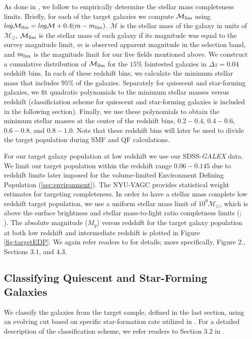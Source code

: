 \documentclass{emulateapj}
\begin{document}
As done in \cite{Moustakas:2013aa}, we follow \cite{Pozzetti:2010aa} to empirically determine the stellar mass completeness limits.
Briefly, for each of the target galaxies we compute $\mathcal{M}_{\rm{lim}}$ using $log \mathcal{M}_{\rm{lim}} = log \mathcal{M} + 0.4 ( m - m_{\rm{lim}})$.
$\mathcal{M}$ is the stellar mass of the galaxy in units of $\mathcal{M_{\odot}}$, $\mathcal{M}_{\rm{lim}}$ is the stellar mass of each galaxy if its magnitude was 
equal to the survey magnitude limit, $m$ is observed apparent magnitude in the selection band, and $m_{\rm{lim}}$ is the magnitude limit for our five fields mentioned above.
We construct a cumulative distribution of $\mathcal{M}_{\rm{lim}}$ for the $15\%$ faintested galaxies in $\Delta z=0.04$ redshift bins.
In each of these redshift bins, we calculate the minimum stellar mass that includes $95 \%$ of the galaxies.
Separately for quiescent and star-forming galaxies, we fit quadratic polynomials to the minimum stellar masses versus redshift (classificiation scheme for quiescent 
and star-forming galaxies is included in the following section).
Finally, we use these polynomials to obtain the minimum stellar masses at the center of the redshift bins, $0.2-0.4$, $0.4-0.6$, $0.6-0.8$, and $0.8-1.0$.
Note that these redshift bins will later be used to divide the target population during SMF and QF calculations.

For our target galaxy population at low redshift we use our SDSS-{\em GALEX} data. 
We limit our target population within the redshift range $0.06-0.145$ due to redshift limits later imposed for the volume-limited Environment Defining Population (\ref{sec:environment}).
The NYU-VAGC provides statistical weight estimates for targeting completeness.
In order to have a stellar mass complete low redshift target population, we use a uniform stellar mass limit of $10^9 \mathcal{M}_{\odot}$, which is above the surface 
brightness and stellar mass-to-light ratio completness limits (\cite{Blanton:2005ab}; \cite{Baldry:2008aa}).
The absolute magnitude ($M_g$) versus redshift for the target galaxy population at both low redshift and intermediate redshift is plotted in Figure \ref{fig:targetEDP}.
We again refer readers to \cite{Moustakas:2013aa} for details; more specifically, Figure 2., Sections 3.1, and 4.3.

\subsection{Classifying Quiescent and Star-Forming Galaxies} \label{sec:sfq}
We classify the galaxies from the target sample, defined in the last section, using an evolving cut based on specific star-formation rate utilized in \cite{Moustakas:2013aa}.
For a detailed description of the classification scheme, we refer readers to Section 3.2 in \cite{Moustakas:2013aa}.
\end{document}

